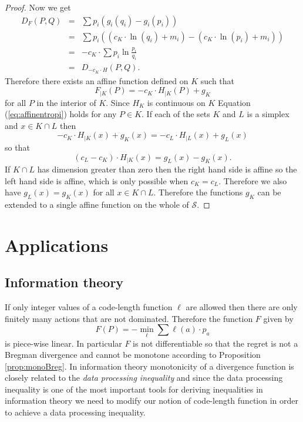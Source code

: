 \documentclass[10pt,a4paper,draft]{article}
\begin{document}
\begin{proof}
Now we get 
\begin{eqnarray*}
D_{F}\left(P,Q\right) & = & \sum
p_{i}\left(g_{i}\left(q_{i}\right)-g_{i}\left(p_{i}\right)\right)\\
& = & \sum
p_{i}\left(\left(c_{K}\cdot\ln\left(q_{i}\right)+m_{i}\right)-\left(c_{K}\cdot\ln\left(p_{i}\right)+m_{i}\right)\right)\\
&=&-c_{K}\cdot\sum
p_{i}\ln\frac{p_{i}}{q_{i}}\\
 & = &D_{ -c_{K}\cdot H}\left(P,Q\right).
\end{eqnarray*}
Therefore there exists an affine function defined on $K$ such that
\begin{equation}\label{eq:affinentropi}
F_{\mid K}(P)=-c_{K}\cdot H_{\mid K}(P)+g_{K}
\end{equation}
for all $P$ in the interior of $K$. Since $H_K$ is continuous on $K$ Equation (\ref{eq:affinentropi}) holds for any $P\in K$. If each of the sets $K$ and $L$ is a 
simplex and $x\in K\cap L$ then  
\[
-c_{K}\cdot H_{\mid
K}\left(x\right)+g_{K}\left(x\right)=-c_{L}\cdot H_{\mid
L}\left(x\right)+g_{L}\left(x\right)
\]
 so that 
\[
\left(c_{L}-c_{K}\right)\cdot H_{\mid
K}\left(x\right)=g_{L}\left(x\right)-g_{K}\left(x\right).
\]
If $K\cap L$ has dimension greater than zero then the right hand side is affine so the left hand side is affine, which is only
possible when $c_{K}=c_{L}.$ Therefore we also have
$g_{L}\left(x\right)=g_{K}\left(x\right)$
for all $x\in K\cap L.$ Therefore the functions $g_{K}$ can be
extended to a single affine function on the whole of $\mathcal{S}.$ 
\end{proof}


\section{Applications}

\subsection{Information theory}

If only integer values of a code-length function $\ell$ are
allowed then there are only finitely many actions that are not
dominated. Therefore the function $F$ given by 
\[
F\left(P\right)=-\min_{\ell}\sum\ell\left(a\right)\cdot p_{a}
\]
is piece-wise linear. In particular $F$ is not differentiable so that the regret is not a Bregman divergence and cannot be monotone according to Proposition \ref{prop:monoBreg}. In information theory monotonicity of a divergence
function is closely related to the \emph{data processing inequality} and since
the data processing inequality is one of the most important tools for
deriving inequalities in information theory we need to modify our notion
of code-length function in order to achieve a data processing
inequality.
\end{document}
